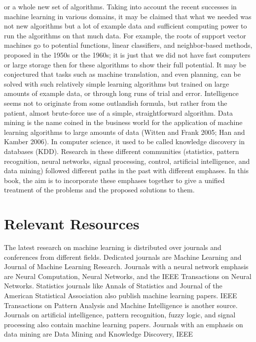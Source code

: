 or a whole new set of algorithms. Taking into account the recent successes in machine learning in various domains, it may be claimed that what we needed was not new algorithms but a lot of example data and sufficient computing power to run the algorithms on that much data. For example, the roots of support vector machines go to potential functions, linear classifiers, and neighbor-based methods, proposed in the 1950s or the 1960s; it is just that we did not have fast computers or large storage then for these algorithms to show their full potential. It may be conjectured that tasks such as machine translation, and even planning, can be solved with such relatively simple learning algorithms but trained on large amounts of example data, or through long runs of trial and error. Intelligence seems not to originate from some outlandish formula, but rather from the patient, almost brute-force use of a simple, straightforward algorithm. Data mining is the name coined in the business world for the application of machine learning algorithms to large amounts of data (Witten and Frank 2005; Han and Kamber 2006). In computer science, it used to be called knowledge discovery in databases (KDD). Research in these different communities (statistics, pattern recognition, neural networks, signal processing, control, artificial intelligence, and data mining) followed different paths in the past with different emphases. In this book, the aim is to incorporate these emphases together to give a unified treatment of the problems and the proposed solutions to them.

\section{Relevant Resources}

The latest research on machine learning is distributed over journals and conferences from different fields. Dedicated journals are Machine Learning and Journal of Machine Learning Research. Journals with a neural network emphasis are Neural Computation, Neural Networks, and the IEEE Transactions on Neural Networks. Statistics journals like Annals of Statistics and Journal of the American Statistical Association also publish machine learning papers. IEEE Transactions on Pattern Analysis and Machine Intelligence is another source. Journals on artificial intelligence, pattern recognition, fuzzy logic, and signal processing also contain machine learning papers. Journals with an emphasis on data mining are Data Mining and Knowledge Discovery, IEEE

